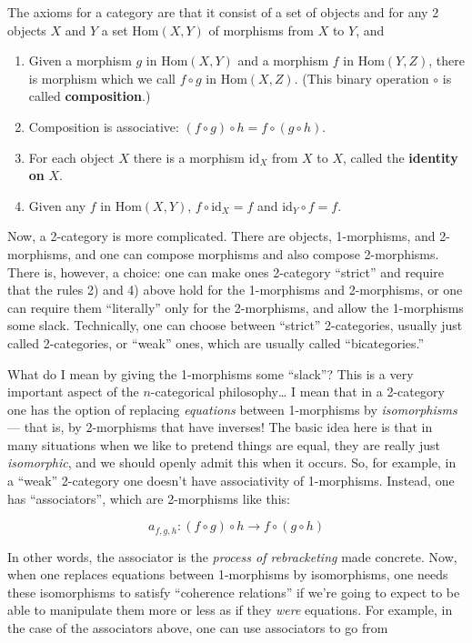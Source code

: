 \documentclass{article}
\def\tightlist{}
\begin{document}
The axioms for a category are that it consist of a set of objects and
for any 2 objects \(X\) and \(Y\) a set \(\mathrm{Hom}(X,Y)\) of
morphisms from \(X\) to \(Y\), and

\begin{enumerate}
\def\labelenumi{\arabic{enumi}.}
\tightlist
\item
  Given a morphism \(g\) in \(\mathrm{Hom}(X,Y)\) and a morphism \(f\)
  in \(\mathrm{Hom}(Y,Z)\), there is morphism which we call
  \(f \circ g\) in \(\mathrm{Hom}(X,Z)\). (This binary operation
  \(\circ\) is called \textbf{composition}.)
\item
  Composition is associative:
  \((f \circ g) \circ h = f \circ (g \circ h)\).
\item
  For each object \(X\) there is a morphism \(\mathrm{id}_X\) from \(X\)
  to \(X\), called the \textbf{identity on} \(X\).
\item
  Given any \(f\) in \(\mathrm{Hom}(X,Y)\),
  \(f \circ \mathrm{id}_X = f\) and \(\mathrm{id}_Y \circ f = f\).
\end{enumerate}

Now, a 2-category is more complicated. There are objects, 1-morphisms,
and 2-morphisms, and one can compose morphisms and also compose
2-morphisms. There is, however, a choice: one can make ones 2-category
``strict'' and require that the rules 2) and 4) above hold for the
1-morphisms and 2-morphisms, or one can require them ``literally'' only
for the 2-morphisms, and allow the 1-morphisms some slack. Technically,
one can choose between ``strict'' 2-categories, usually just called
2-categories, or ``weak'' ones, which are usually called
``bicategories.''

What do I mean by giving the 1-morphisms some ``slack''? This is a very
important aspect of the \(n\)-categorical philosophy\ldots{} I mean that
in a 2-category one has the option of replacing \emph{equations} between
1-morphisms by \emph{isomorphisms} --- that is, by 2-morphisms that have
inverses! The basic idea here is that in many situations when we like to
pretend things are equal, they are really just \emph{isomorphic}, and we
should openly admit this when it occurs. So, for example, in a ``weak''
2-category one doesn't have associativity of 1-morphisms. Instead, one
has ``associators'', which are 2-morphisms like this:

\[a_{f,g,h}: (f \circ g) \circ h \to f \circ (g \circ h)\]

In other words, the associator is the \emph{process of rebracketing}
made concrete. Now, when one replaces equations between 1-morphisms by
isomorphisms, one needs these isomorphisms to satisfy ``coherence
relations'' if we're going to expect to be able to manipulate them more
or less as if they \emph{were} equations. For example, in the case of
the associators above, one can use associators to go from
\end{document}
